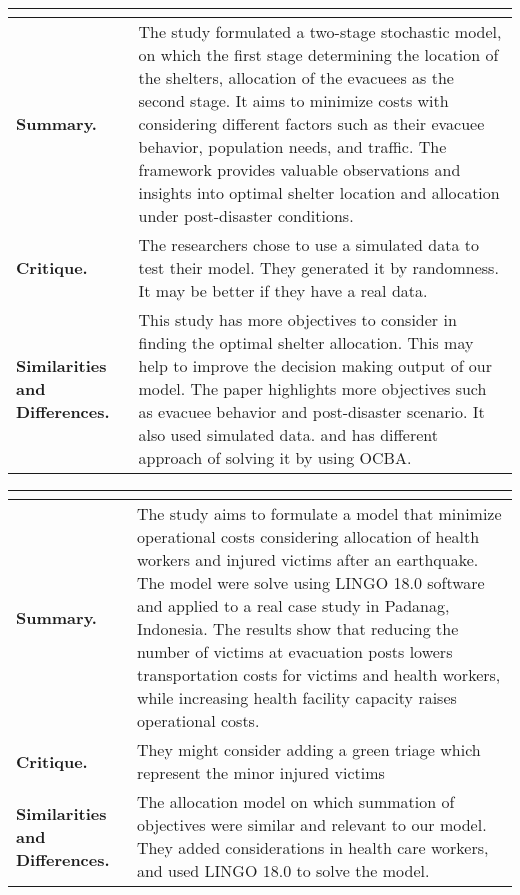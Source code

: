 \begin{longtable}{|L{.2\linewidth}|L{.74\linewidth}|}
	\hline
	\\ \hline
	\textbf{Summary.} & The study formulated a two-stage stochastic model, on which the first stage determining the location of the shelters, allocation of the evacuees as the second stage. It aims to minimize costs with considering different factors such as their evacuee behavior, population needs, and traffic. The framework provides valuable observations and insights into optimal shelter location and allocation under post-disaster conditions. \\ \hline
	\textbf{Critique.} & The researchers chose to use a simulated data to test their model. They generated it by randomness. It may be better if they have a real data. \\ \hline
	\textbf{Similarities and Differences.} & This study has more objectives to consider in finding the optimal shelter allocation. This may help to improve the decision making output of our model.	The paper highlights more objectives such as evacuee behavior and post-disaster scenario. It also used simulated data. and has different approach of solving it by using OCBA.  \\ \hline
\end{longtable}

\begin{longtable}{|L{.2\linewidth}|L{.74\linewidth}|}
	\hline
	\\ \hline
	\textbf{Summary.} & The study aims to formulate a model that minimize operational costs considering allocation of health workers and injured victims after an earthquake. The model were solve using LINGO 18.0 software and applied to a real case study in Padanag, Indonesia. The results show that reducing the number of victims at evacuation posts lowers transportation costs for victims and health workers, while increasing health facility capacity raises operational costs. \\ \hline
	\textbf{Critique.} & They might consider adding a green triage which represent the minor injured victims \\ \hline
	\textbf{Similarities and Differences.} & The allocation model on which summation of objectives were similar and relevant to our model.	They added considerations in health care workers, and used LINGO 18.0 to solve the model.  \\ \hline
\end{longtable}

